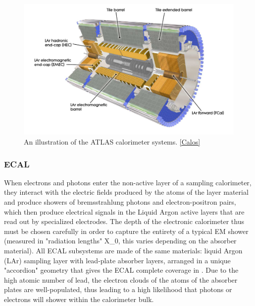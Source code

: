 \begin{figure}
  \includegraphics[width=\linewidth]{figures/detector_chapter/Calos.png}
  \caption{An illustration of the ATLAS calorimeter systems. \ref{Calos}}
  \label{fig:Calos}
\end{figure}


\subsubsection{ECAL} \label{sec:ECAL} 

When electrons and photons enter the non-active layer of a sampling calorimeter, they interact with the electric fields produced by the atoms of the layer material and produce showers of bremsstrahlung photons and electron-positron pairs, which then produce electrical signals in the Liquid Argon active layers that are read out by specialized electrodes. The depth of the electronic calorimeter thus must be chosen carefully in order to capture the entirety of a typical EM shower (measured in "radiation lengths" X_0, this varies depending on the absorber material). All ECAL subsystems are made of the same materials: liquid Argon (LAr) sampling layer with lead-plate absorber layers, arranged in a unique "accordion" geometry that gives the ECAL complete coverage in \phi . Due to the high atomic number of lead, the electron clouds of the atoms of the absorber plates are well-populated, thus leading to a high likelihood that photons or electrons will shower within the calorimeter bulk.

